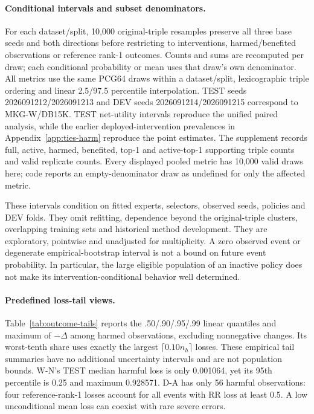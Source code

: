 \documentclass[11pt,a4paper]{article}
\begin{document}
\paragraph{Conditional intervals and subset denominators.}
For each dataset/split, 10,000 original-triple resamples preserve all three base seeds and both directions before restricting to interventions, harmed/benefited observations or reference rank-1 outcomes. Counts and sums are recomputed per draw; each conditional probability or mean uses that draw's own denominator. All metrics use the same PCG64 draws within a dataset/split, lexicographic triple ordering and linear 2.5/97.5 percentile interpolation. TEST seeds 2026091212/2026091213 and DEV seeds 2026091214/2026091215 correspond to MKG-W/DB15K. TEST net-utility intervals reproduce the unified paired analysis, while the earlier deployed-intervention prevalences in Appendix~\ref{app:ties-harm} reproduce the point estimates. The supplement records full, active, harmed, benefited, top-1 and active-top-1 supporting triple counts and valid replicate counts. Every displayed pooled metric has 10,000 valid draws here; code reports an empty-denominator draw as undefined for only the affected metric.

These intervals condition on fitted experts, selectors, observed seeds, policies and DEV folds. They omit refitting, dependence beyond the original-triple clusters, overlapping training sets and historical method development. They are exploratory, pointwise and unadjusted for multiplicity. A zero observed event or degenerate empirical-bootstrap interval is not a bound on future event probability. In particular, the large eligible population of an inactive policy does not make its intervention-conditional behavior well determined.

\paragraph{Predefined loss-tail views.}
Table~\ref{tab:outcome-tails} reports the .50/.90/.95/.99 linear quantiles and maximum of $-\Delta$ among harmed observations, excluding nonnegative changes. Its worst-tenth share uses exactly the largest $\lceil0.10n_h\rceil$ losses. These empirical tail summaries have no additional uncertainty intervals and are not population bounds. W-N's TEST median harmful loss is only 0.001064, yet its 95th percentile is 0.25 and maximum 0.928571. D-A has only 56 harmful observations: four reference-rank-1 losses account for all events with RR loss at least 0.5. A low unconditional mean loss can coexist with rare severe errors.

\end{document}
